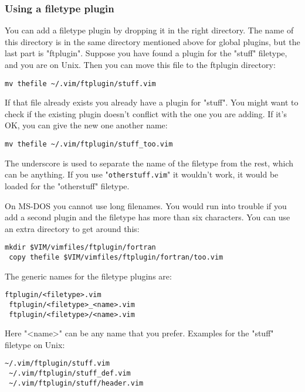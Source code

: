 \subsubsection{Using a filetype plugin}
\label{ftplugin-name}

You can add a filetype plugin by dropping it in the right directory.
The name of this directory is in the same directory mentioned above for global plugins, but the last part is "ftplugin".
Suppose you have found a plugin for the "stuff" filetype, and you are on Unix.
Then you can move this file to the ftplugin directory:

 \begin{Verbatim}[samepage=true]
 mv thefile ~/.vim/ftplugin/stuff.vim
 \end{Verbatim}

If that file already exists you already have a plugin for "stuff".
You might want to check if the existing plugin doesn't conflict with the one you are adding.
If it's OK, you can give the new one another name:

 \begin{Verbatim}[samepage=true]
 mv thefile ~/.vim/ftplugin/stuff_too.vim
 \end{Verbatim}

The underscore is used to separate the name of the filetype from the rest, which can be anything.
If you use "\texttt{otherstuff.vim}" it wouldn't work, it would be loaded for the "otherstuff" filetype.

On MS-DOS you cannot use long filenames.
You would run into trouble if you add a second plugin and the filetype has more than six characters.
You can use an extra directory to get around this:

 \begin{Verbatim}[samepage=true]
 mkdir $VIM/vimfiles/ftplugin/fortran
 copy thefile $VIM/vimfiles/ftplugin/fortran/too.vim
 \end{Verbatim}

The generic names for the filetype plugins are:

 \begin{Verbatim}[samepage=true]
 ftplugin/<filetype>.vim
 ftplugin/<filetype>_<name>.vim
 ftplugin/<filetype>/<name>.vim
 \end{Verbatim}

Here "<name>" can be any name that you prefer.
Examples for the "stuff" filetype on Unix:

 \begin{Verbatim}[samepage=true]
 ~/.vim/ftplugin/stuff.vim
 ~/.vim/ftplugin/stuff_def.vim
 ~/.vim/ftplugin/stuff/header.vim
 \end{Verbatim}

